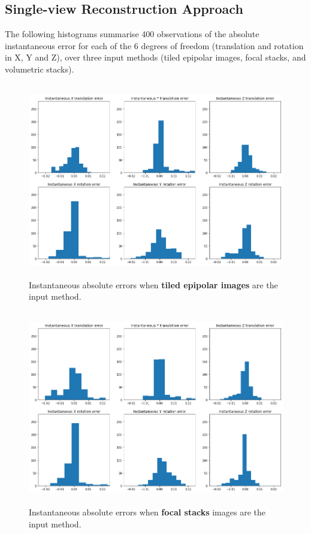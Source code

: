 \subsection{Single-view Reconstruction Approach}

The following histograms summarise 400 observations of the absolute instantaneous error for each of the 6 degrees of freedom (translation and rotation in X, Y and Z), over three input methods (tiled epipolar images, focal stacks, and volumetric stacks).

\begin{figure}[H]
    \centering
    \includegraphics[width=\textwidth, height=3.35in]{images/result-examples/pose/errors/singlewarp-epi.png}
    \caption{Instantaneous absolute errors when \textbf{tiled epipolar images} are the input method.}
\end{figure}

\begin{figure}[H]
    \centering
    \includegraphics[width=\textwidth, height=3.35in]{images/result-examples/pose/errors/singlewarp-focalstack-17-5.png}
    \caption{Instantaneous absolute errors when \textbf{focal stacks} images are the input method.}
\end{figure}

